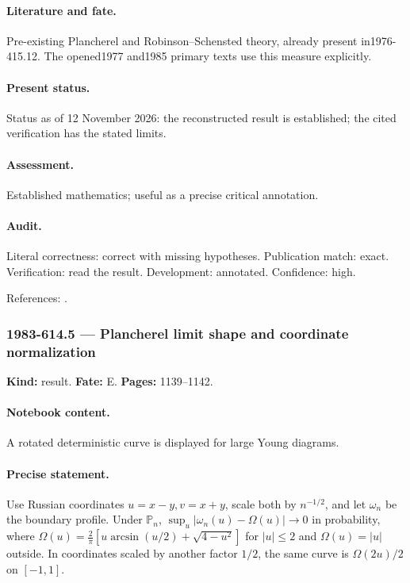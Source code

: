 \paragraph{Literature and fate.} Pre-existing Plancherel and Robinson--Schensted theory, already present in1976-415.12. The opened1977 and1985 primary texts use this measure explicitly.

\paragraph{Present status.} Status as of 12 November 2026: the reconstructed result is established; the cited verification has the stated limits.

\paragraph{Assessment.} Established mathematics; useful as a precise critical annotation.

\paragraph{Audit.} Literal correctness: correct with missing hypotheses. Publication match: exact. Verification: read the result. Development: annotated. Confidence: high.

\noindent References: \citep{vershikkerov1977asymptotics,vershikkerov1985dimensions}.\par

\subsubsection{1983-614.5 --- Plancherel limit shape and coordinate normalization}

\label{item:1983-614.5}

\noindent\textbf{Kind:} result. \textbf{Fate:} E. \textbf{Pages:} 1139--1142.\par

\paragraph{Notebook content.} A rotated deterministic curve is displayed for large Young diagrams.

\paragraph{Precise statement.} Use Russian coordinates $u=x-y,v=x+y$, scale both by $n^{-1/2}$, and let $\omega_n$ be the boundary profile. Under $\mathbb P_n$, $\sup_u|\omega_n(u)-\Omega(u)|\to0$ in probability, where $\Omega(u)=\frac2\pi[u\arcsin(u/2)+\sqrt{4-u^2}]$ for $|u|\le2$ and $\Omega(u)=|u|$ outside. In coordinates scaled by another factor $1/2$, the same curve is $\Omega(2u)/2$ on $[-1,1]$.

